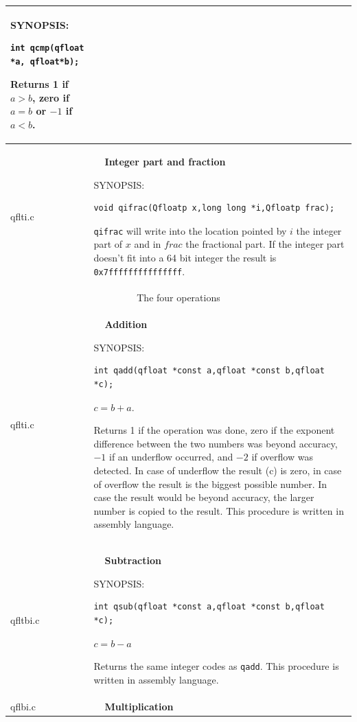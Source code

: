 \documentclass[10pt,a4paper,x11names]{memoir} %
\newcounter{entry}
\newcommand{\TOC}[1] {\addcontentsline{toc}{section}{\theentry\ \  #1} \textbf{\theentry\ \  #1} \par\stepcounter{entry}}
\begin{document}
\begin{longtable}{|p{1.5cm}|p{11.5cm}|}
	{\footnotesize SYNOPSIS:}\vspace{-0.2cm}\index{qcmp}
	\begin{lstlisting}[numbers=none]
		int qcmp(qfloat *a, qfloat*b);
	\end{lstlisting}\vspace{-0.2cm} \par
	Returns 1 if $a> b$, zero if $a = b$ or $-1$ if $a<b$.
	\\\hline
	qflti.c& \TOC{Integer part and fraction}
	
	{\footnotesize SYNOPSIS:}\vspace{-0.2cm}\index{qifrac}
	\begin{lstlisting}[numbers=none]
		void qifrac(Qfloatp x,long long *i,Qfloatp frac);
	\end{lstlisting}\vspace{-0.2cm} \par
	\verb,qifrac, will write into the location pointed by $i$ the integer part of $x$ and in $frac$ the fractional part. If the integer part doesn't fit into a 64 bit integer the result is \verb,0x7fffffffffffffff,.
	\\\hline
	\multicolumn{2}{c}{The four operations}
	\\\hline
	qflti.c& \TOC{Addition}\index{qadd}
	
	{\footnotesize SYNOPSIS:}\vspace{-0.2cm}
	\begin{lstlisting}[numbers=none]
		int qadd(qfloat *const a,qfloat *const b,qfloat *c);
	\end{lstlisting}\vspace{-0.2cm} $ c=b+a$.\par
	Returns 1 if the operation was done, zero if the exponent difference between the two numbers was beyond accuracy, $-1$ if an underflow occurred, and $-2$ if overflow was detected. In case of underflow the result (c) is zero, in case of overflow the result is the biggest possible number. In case the result would be beyond accuracy, the larger number is copied to the result.
	This procedure is written in assembly language.
	\\\hline
	
	qfltbi.c& \TOC{Subtraction}
	
	{\footnotesize SYNOPSIS:}\vspace{-0.2cm}\index{qsub}
	\begin{lstlisting}[numbers=none]
		int qsub(qfloat *const a,qfloat *const b,qfloat *c);
	\end{lstlisting}\vspace{-0.2cm}
	$ c=b-a$\par
	Returns the same integer codes as \verb,qadd,. This procedure is written in assembly language.
	\\\hline
	qflbi.c& \TOC{Multiplication}
	

\end{longtable}
\end{document}
